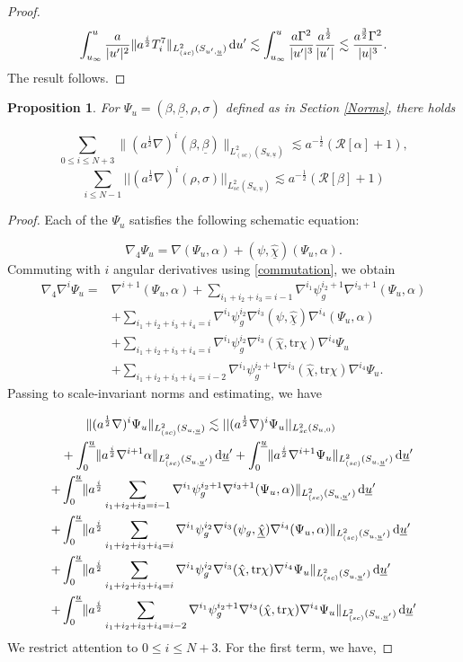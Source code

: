 \documentclass{amsart}
\newtheorem{proposition}{Proposition}[section]
\newcommand{\aln}{(\al \nabla)^i}
\newcommand{\ali}{a^{\frac{i}{2}}}
\newcommand{\dubarprime}{\hspace{.5mm} \text{d} \ubar^{\prime}}
\newcommand{\intu}{\int_{u_{\infty}}^u}
\newcommand{\intubar}{\int_0^{\ubar}}
\newcommand{\chihat}{\hat{\chi}}
\newcommand{\upr}{\lvert u^\prime \rvert}
\newcommand{\al}{a^{\frac{1}{2}}}
\newcommand{\chibarhat}{\underline{\hat{\chi}}}
\newcommand{\ubar}{\underline{u}}
\newcommand{\sumif}{\sum_{i_1+i_2+i_3+i_4=i}}
\newcommand{\sumifim}{\sum_{i_1+i_2+i_3+i_4=i-2}}
\newcommand{\be}{\begin{equation}}
\newcommand{\ee}{\end{equation}}
\newcommand{\nablap}{\nabla^{i_1}\psi_g^{i_2}}
\newcommand{\nablapp}{\nabla^{i_1}\psi_g^{i_2+1}}
\newcommand{\scaletwoSu}[1]{\lVert{#1} \rVert_{L^2_{(sc)}(S_{u,\ubar})}}
\newcommand{\scaletwoSuprime}[1]{\lVert{#1} \rVert_{L^2_{(sc)}(S_{u^\prime,\ubar})}}
\newcommand{\scaletwoSuubarprime}[1]{\lVert{#1} \rVert_{L^2_{(sc)}(S_{u,\ubar^\prime})}}
\newcommand{\betabar}{\underline{\beta}}
\newcommand{\duprime}{\hspace{.5mm} \text{d}u^{\prime}}
\newcommand{\nablat}{\nabla^{i_3}}
\newcommand{\nablaf}{\nabla^{i_4}}
\newcommand{\tr}{\mbox{tr}}
\begin{document}
{\begin{proof}
    \begin{align}
        \intu \frac{a}{\upr^2}\scaletwoSuprime{\ali T_i^7} \duprime \lesssim \intu \frac{a \Gamma^2}{\upr^3}\frac{a^{\frac{1}{2}}}{|u^{'}|}\lesssim \frac{a^{\frac{3}{2}}\Gamma^{2}}{|u|^{3}}.
    \end{align}The result follows.
    
\end{proof}
\begin{proposition}\label{psiuprop}
For $\Psi_u=(\beta,\betabar,\rho,\sigma)$ defined as in Section \ref{Norms}, there holds

\[ \sum_{0\leq i \leq N+3} \scaletwoSu{\aln (\beta,\betabar)} \lesssim a^{-\frac{1}{2}}(\mathcal{R}[\alpha] +1),\]\[\sum_{i\leq N-1}||(a^{\frac{1}{2}}\nabla)^{i}(\rho,\sigma)||_{L^{2}_{sc}(S_{u,\ubar})}\lesssim a^{-\frac{1}{2}}(\mathcal{R}[\beta]+1)\]
\end{proposition} 

\begin{proof}
Each of the $\Psi_u$ satisfies the following schematic equation:

\be \nabla_4 \Psi_u = \nabla\left(\Psi_u, \alpha\right) + (\psi, \chibarhat) \left(\Psi_u, \alpha\right). \ee Commuting with $i$ angular derivatives using \ref{commutation}, we obtain
\begin{align}
 \nonumber   \nabla_4 \nabla^i \Psi_u =& \nabla^{i+1}(\Psi_u,\alpha) +\sum_{i_1+i_2+i_3=i-1} \nablapp \nabla^{i_3+1} (\Psi_u,\alpha)\\  \nonumber &+ \sumif \nablap\nablat(\psi,\chibarhat)\nablaf (\Psi_u,\alpha) \\  \nonumber   &+\sumif \nablap \nablat(\chihat,\tr\chi)\nablaf \Psi_u \\  \nonumber &+\sumifim \nablapp\nablat(\chihat,\tr\chi)\nablaf \Psi_u.
\end{align} Passing to scale-invariant norms and estimating, we have

\begin{align}
 \nonumber     &\hspace{7mm}\scaletwoSu{\aln \Psi_u}\lesssim ||(a^{\frac{1}{2}}\nabla)^{i}\Psi_{u}||_{L^{2}_{sc}(S_{u,0})} \\  \nonumber  &+\intubar \scaletwoSuubarprime{a^{\frac{i}{2}} \nabla^{i+1}\alpha} \dubarprime +\intubar \scaletwoSuubarprime{a^{\frac{i}{2}} \nabla^{i+1}\Psi_u} \dubarprime \\  \nonumber + &\intubar \scaletwoSuubarprime{a^{\frac{i}{2}}\sum_{i_1+i_2+i_3=i-1}\nablapp \nabla^{i_3+1}(\Psi_u,\alpha)}\dubarprime \\  \nonumber +&\intubar \scaletwoSuubarprime{a^{\frac{i}{2}}\sumif\nablap \nablat(\psi_g, \chibarhat)\nablaf(\Psi_u,\alpha)} \dubarprime \\  \nonumber  +& \intubar \scaletwoSuubarprime{a^{\frac{i}{2}}\sumif \nablap \nablat(\chihat,\tr\chi)\nablaf\Psi_u }\dubarprime \\  \nonumber +& \intubar \scaletwoSuubarprime{a^{\frac{i}{2}}\sumifim \nablapp \nablat(\chihat,\tr\chi)\nablaf \Psi_u}\dubarprime 
\end{align}We restrict attention to $0\leq i \leq N+3$. For the first term, we have, 


\end{proof}}
\end{document}
